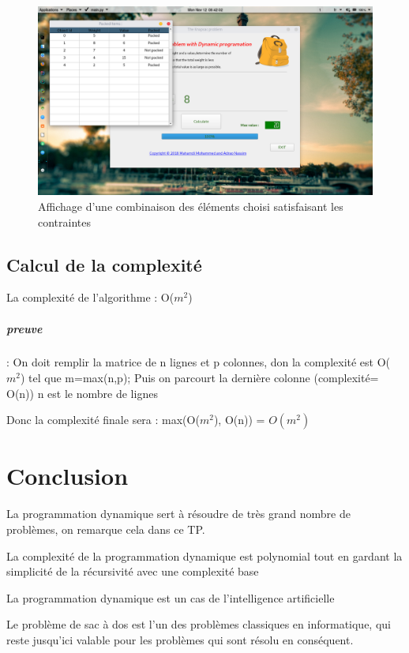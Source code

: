 \documentclass[12pt]{report}
\begin{document}
	\begin{figure}[h!]
	\centering
	\includegraphics[scale=1, width=18cm]{../screenshots/5.png}
	\caption{Affichage d'une combinaison des éléments choisi satisfaisant les contraintes}
	\end{figure}
	\newpage	
	\FloatBarrier
	\section{Calcul de la complexité}
	\par{} 
	
	La complexité de l'algorithme : O($m^{2}$)
	
	\paragraph*{preuve}:
	On doit remplir la matrice de n lignes et p colonnes, don la complexité est O($m^{2}$) tel que m=max(n,p); 	Puis on parcourt la dernière colonne (complexité= O(n)) n est le nombre de lignes
	\par{}
	Donc la complexité finale sera : max(O($m^{2}$), O(n)) = $O(m^{2})$
	\chapter{Conclusion}
	\par{} 
	La programmation dynamique sert à résoudre de très grand nombre de problèmes, on remarque cela dans ce TP.
\par{}	
	La complexité de la programmation dynamique est polynomial tout en gardant la simplicité de la récursivité avec une complexité base
	\par{}
	La programmation dynamique est un cas de l'intelligence artificielle 
	\par{}
	Le problème de sac à dos est l'un des problèmes classiques en informatique, qui reste jusqu'ici valable pour les problèmes qui sont résolu en conséquent.
\end{document}
